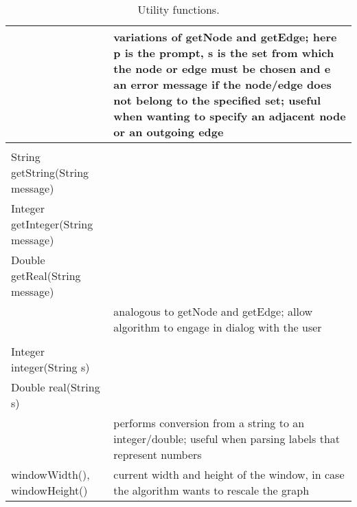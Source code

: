 \begin{table}
\begin{tabular}{| m{} | m{} |}
{      \mbox{}
    }
    &
    variations of \textsf{getNode} and \textsf{getEdge}; here \textsf{p}
    is the prompt, \textsf{s} is the set from which the node or edge must be
    chosen and \textsf{e} an error message if the node/edge does not belong to the specified set;
    useful when wanting to specify an adjacent node or an outgoing edge
    \\ \hline
    \shortstack[l] {
      \mbox{}
      \\[\smallskipamount]
      \textsf{String getString(String message)}\\
      \textsf{Integer getInteger(String message)}\\
      \textsf{Double getReal(String message)} \\
      \mbox{}
    }
    &
    analogous to \textsf{getNode} and \textsf{getEdge}; allow algorithm to engage
    in dialog with the user
    \\ \hline
    \shortstack[l] {
      \mbox{}
      \\[\smallskipamount]
      \textsf{Integer integer(String s)}\\
      \textsf{Double real(String s)} \\
      \mbox{}
    }
    &
    performs conversion from a string to an integer/double; useful when parsing
    labels that represent numbers
    \\ \hline
    \textsf{windowWidth()}, \textsf{windowHeight()}
    &
    current width and height of the window, in case the algorithm wants to rescale
    the graph
    \\ \hline
  \end{tabular}
  \caption{Utility functions.}
  \label{tab:utility_functions}
\end{table}

